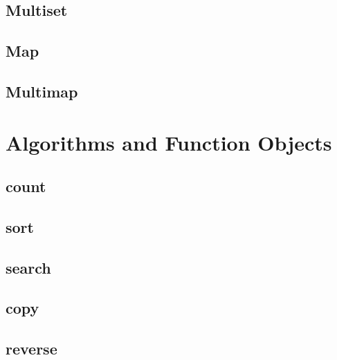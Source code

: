 \documentclass[11pt,a4paper]{article}
\begin{document}
\subsection{Multiset}

\subsection{Map}

\subsection{Multimap}

\newpage
\section{Algorithms and Function Objects}
\subsection{count}
\subsection{sort}
\subsection{search}
\subsection{copy}
\subsection{reverse}
\end{document}
